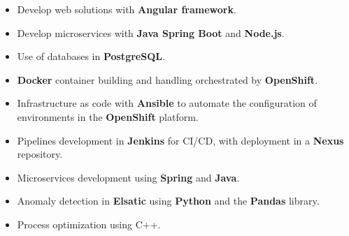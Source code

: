 \documentclass[letterpaper]{style} %
\begin{document}



\begin{itemize}
	\item Develop web solutions with \textbf{Angular framework}.
	\item Develop microservices with \textbf{Java Spring Boot} and \textbf{Node.js}.
	\item Use of databases in \textbf{PostgreSQL}.
\end{itemize}

\divider

\begin{itemize}
	\item \textbf{Docker} container building and handling orchestrated by \textbf{OpenShift}.
	\item Infrastructure as code with \textbf{Ansible} to automate the configuration of environments in the \textbf {OpenShift} platform.
	\item Pipelines development in \textbf{Jenkins} for CI/CD, with deployment in a \textbf{Nexus} repository.
	\item Microservices development using \textbf{Spring} and \textbf{Java}.
	\item Anomaly detection in \textbf{Elsatic} using \textbf{Python} and the \textbf{Pandas} library.
	\item Process optimization using C++.
\end{itemize}
\end{document}
